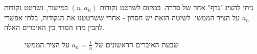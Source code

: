 \documentclass{article}
\begin{document}






























































































ניתן להציג 
"גרף" אחר של סדרה. במקום לשרטט נקודות 
$(n,a_n)$ 
במישור, 
נשרטט נקודות 
$a_n$ 
על הציר הממשי. 
לשיטה הזאת יש חסרון - אחרי ששרטטנו את הנקודות, בלתי אפשרי להבין מהו הסדר בין האיברים האלה. 

\begin{figure}[h]
\centering
{}
\caption{שבעת האיברים הראשונים של $a_n=\frac{1}{n}$ על הציר הממשי}
\label{fig:sequence-on-real-line}
\end{figure}
\end{document}
